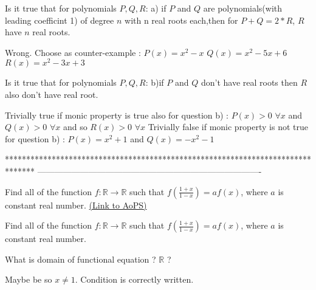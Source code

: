 \begin{solution}
	\begin{tcolorbox}Is it true that for  polynomials $P,Q,R$:
a) if $P$ and $Q$ are polynomials(with leading coefficint 1) of degree $n$ with n real roots each,then for $P+Q=2*R$, $R$ have $n$ real roots.\end{tcolorbox}
Wrong. Choose as counter-example :
$P(x)=x^2-x$
$Q(x)=x^2-5x+6$
$R(x)=x^2-3x+3$
\end{solution}



\begin{solution}
	\begin{tcolorbox}Is it true that for  polynomials $P,Q,R$:
b)if $P$ and $Q$ don't have real roots then $R$ also don't have real root.\end{tcolorbox}
Trivially true if monic property is true also for question b) : $P(x)>0$ $\forall x$ and $Q(x)>0$ $\forall x$ and so $R(x)>0$ $\forall x$
Trivially false if monic property is not true for question b) : $P(x)=x^2+1$ and $Q(x)=-x^2-1$
\end{solution}
*******************************************************************************
-------------------------------------------------------------------------------

\begin{problem}
	Find all of the function $f: \mathbb{R}\to\mathbb{R}$ such that $f(\frac{1+x}{1-x})=af(x)$, where $a$ is constant real number.
	\flushright \href{https://artofproblemsolving.com/community/c6h578955}{(Link to AoPS)}
\end{problem}



\begin{solution}
	\begin{tcolorbox}Find all of the function $f: \mathbb{R}\to\mathbb{R}$ such that $f(\frac{1+x}{1-x})=af(x)$, where $a$ is constant real number.\end{tcolorbox}
What is domain of functional equation ? $\mathbb R$ ?
\end{solution}



\begin{solution}
	Maybe be so $x{\neq}1$. Condition is correctly written.
\end{solution}



